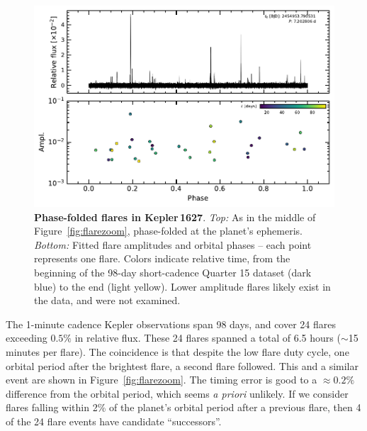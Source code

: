 \documentclass[12pt,modern,tighten]{aastex63}
\begin{document}
\begin{figure}[t]
	\begin{center}
		\leavevmode
		\includegraphics[width=1.0\textwidth]{f8.pdf}
	\end{center}
	\vspace{-0.7cm}
	\caption{
		{\bf Phase-folded flares in Kepler\,1627}.  
    {\it Top:}
    As in the middle of Figure~\ref{fig:flarezoom}, phase-folded at
    the planet's ephemeris.
    {\it Bottom:}
    Fitted flare amplitudes and orbital phases -- each point
    represents one flare.
    Colors indicate relative time, from the beginning of the
    98-day short-cadence Quarter 15 dataset (dark blue) to the end (light
    yellow).
    Lower amplitude flares likely exist in the data, and were not
    examined.
		\label{fig:flarephase}
	}
\end{figure}


The 1-minute cadence Kepler observations span 98 days, and cover 24
flares exceeding $0.5\%$ in relative flux.  These 24 flares spanned a
total of 6.5 hours ($\sim$15 minutes per flare).  The coincidence is
that despite the low flare duty cycle, one orbital period after the
brightest flare, a second flare followed.  This and a similar
event are shown in Figure~\ref{fig:flarezoom}.  The timing error is
good to a $\approx0.2\%$ difference from the orbital period, which
seems {\it a priori} unlikely.  If we consider flares falling within
2\% of the planet's orbital period after a previous flare, then 4 of
the 24 flare events have candidate ``successors''.
\end{document}
